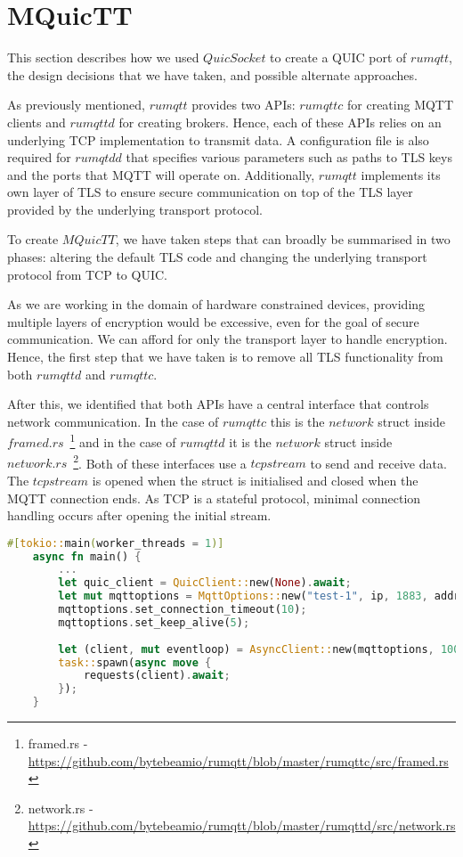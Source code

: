 \section{MQuicTT} \label{chap:port}

This section describes how we used $QuicSocket$ to create a QUIC port of $rumqtt$, the design decisions that we have taken, and possible alternate approaches.

As previously mentioned, $rumqtt$ provides two APIs: $rumqttc$ for creating MQTT clients and $rumqttd$ for creating brokers.
Hence, each of these APIs relies on an underlying TCP implementation to transmit data.
A configuration file is also required for $rumqtdd$ that specifies various parameters such as paths to TLS keys and the ports that MQTT will operate on.
Additionally, $rumqtt$ implements its own layer of TLS to ensure secure communication on top of the TLS layer provided by the underlying transport protocol.

To create $MQuicTT$, we have taken steps that can broadly be summarised in two phases: altering the default TLS code and changing the underlying transport protocol from TCP to QUIC.

As we are working in the domain of hardware constrained devices, providing multiple layers of encryption would be excessive, even for the goal of secure communication.
We can afford for only the transport layer to handle encryption.
Hence, the first step that we have taken is to remove all TLS functionality from both $rumqttd$ and $rumqttc$.

After this, we identified that both APIs have a central interface that controls network communication.
In the case of $rumqttc$ this is the $network$ struct inside $framed.rs$~\footnote{framed.rs - \url{https://github.com/bytebeamio/rumqtt/blob/master/rumqttc/src/framed.rs}} and in the case of $rumqttd$ it is the $network$ struct inside $network.rs$~\footnote{network.rs - \url{https://github.com/bytebeamio/rumqtt/blob/master/rumqttd/src/network.rs}}.
Both of these interfaces use a $tcpstream$ to send and receive data.
The $tcpstream$ is opened when the struct is initialised and closed when the MQTT connection ends.
As TCP is a stateful protocol, minimal connection handling occurs after opening the initial stream.

\begin{lstlisting}[language=Rust, caption={An example of initialising an MQuicTT client. The QUIC connection is established by initialising a $QuicClient$ and the resulting client is passed as an MQTT option.}, label=lst:MQuicTT:client]
    #[tokio::main(worker_threads = 1)]
    async fn main() {
        ...
        let quic_client = QuicClient::new(None).await;
        let mut mqttoptions = MqttOptions::new("test-1", ip, 1883, addr, quic_client);
        mqttoptions.set_connection_timeout(10);
        mqttoptions.set_keep_alive(5);
    
        let (client, mut eventloop) = AsyncClient::new(mqttoptions, 100);
        task::spawn(async move {
            requests(client).await;
        });
    }
\end{lstlisting}

